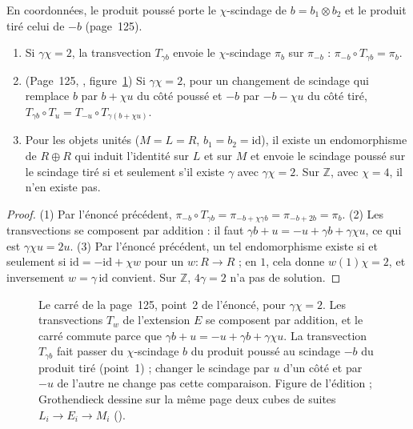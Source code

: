\begin{enonce}
En coordonnées, le produit poussé porte le $\chi$-scindage de $b = b_1 \otimes b_2$ et le produit tiré celui de $-b$ (page~125).
\begin{enumerate}
\item Si $\gamma\chi = 2$, la transvection $T_{\gamma b}$ envoie le $\chi$-scindage $\pi_b$ sur $\pi_{-b}$ : $\pi_{-b} \circ T_{\gamma b} = \pi_b$.
\item (Page~125, , figure~\ref{fig:84-carre}) Si $\gamma\chi = 2$, pour un changement de scindage qui remplace $b$ par $b + \chi u$ du côté poussé et $-b$ par $-b - \chi u$ du côté tiré, $T_{\gamma b} \circ T_u = T_{-u} \circ T_{\gamma(b + \chi u)}$.
\item Pour les objets unités ($M = L = R$, $b_1 = b_2 = \mathrm{id}$), il existe un endomorphisme de $R \oplus R$ qui induit l'identité sur $L$ et sur $M$ et envoie le scindage poussé sur le scindage tiré si et seulement s'il existe $\gamma$ avec $\gamma\chi = 2$. Sur $\mathbb Z$, avec $\chi = 4$, il n'en existe pas.
\end{enumerate}
\end{enonce}

\begin{proof}
(1) Par l'énoncé précédent, $\pi_{-b} \circ T_{\gamma b} = \pi_{-b + \chi\gamma b} = \pi_{-b + 2b} = \pi_b$. (2) Les transvections se composent par addition : il faut $\gamma b + u = -u + \gamma b + \gamma\chi u$, ce qui est $\gamma\chi u = 2u$. (3) Par l'énoncé précédent, un tel endomorphisme existe si et seulement si $\mathrm{id} = -\mathrm{id} + \chi w$ pour un $w : R \to R$ ; en $1$, cela donne $w(1)\chi = 2$, et inversement $w = \gamma\,\mathrm{id}$ convient. Sur $\mathbb Z$, $4\gamma = 2$ n'a pas de solution.
\end{proof}

\begin{figure}[htbp]
\centering
{}
\caption{Le carré  de la page~125, point~2 de l'énoncé, pour $\gamma\chi = 2$. Les transvections $T_w$ de l'extension $E$ se composent par addition, et le carré commute parce que $\gamma b + u = -u + \gamma b + \gamma\chi u$. La transvection $T_{\gamma b}$ fait passer du $\chi$-scindage $b$ du produit poussé au scindage $-b$ du produit tiré (point~1) ; changer le scindage par $u$ d'un côté et par $-u$ de l'autre ne change pas cette comparaison. Figure de l'édition ; Grothendieck dessine sur la même page deux cubes de suites $L_i \to E_i \to M_i$ ().}
\label{fig:84-carre}
\end{figure}


